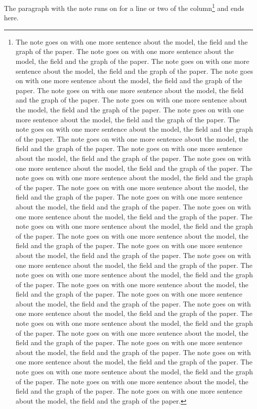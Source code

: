 \documentclass{article}
\begin{document}
The paragraph with the note runs on for a line or two of the column\footnote{The note goes on with one more sentence about the model, the field and the graph of the paper. The note goes on with one more sentence about the model, the field and the graph of the paper. The note goes on with one more sentence about the model, the field and the graph of the paper. The note goes on with one more sentence about the model, the field and the graph of the paper. The note goes on with one more sentence about the model, the field and the graph of the paper. The note goes on with one more sentence about the model, the field and the graph of the paper. The note goes on with one more sentence about the model, the field and the graph of the paper. The note goes on with one more sentence about the model, the field and the graph of the paper. The note goes on with one more sentence about the model, the field and the graph of the paper. The note goes on with one more sentence about the model, the field and the graph of the paper. The note goes on with one more sentence about the model, the field and the graph of the paper. The note goes on with one more sentence about the model, the field and the graph of the paper. The note goes on with one more sentence about the model, the field and the graph of the paper. The note goes on with one more sentence about the model, the field and the graph of the paper. The note goes on with one more sentence about the model, the field and the graph of the paper. The note goes on with one more sentence about the model, the field and the graph of the paper. The note goes on with one more sentence about the model, the field and the graph of the paper. The note goes on with one more sentence about the model, the field and the graph of the paper. The note goes on with one more sentence about the model, the field and the graph of the paper. The note goes on with one more sentence about the model, the field and the graph of the paper. The note goes on with one more sentence about the model, the field and the graph of the paper. The note goes on with one more sentence about the model, the field and the graph of the paper. The note goes on with one more sentence about the model, the field and the graph of the paper. The note goes on with one more sentence about the model, the field and the graph of the paper. The note goes on with one more sentence about the model, the field and the graph of the paper. The note goes on with one more sentence about the model, the field and the graph of the paper. The note goes on with one more sentence about the model, the field and the graph of the paper. The note goes on with one more sentence about the model, the field and the graph of the paper. The note goes on with one more sentence about the model, the field and the graph of the paper. The note goes on with one more sentence about the model, the field and the graph of the paper.} and ends here.
\end{document}
